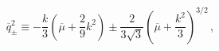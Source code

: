 \begin{equation}
\overline{q}_{\pm}^2\equiv -\frac{k}{3}\left(\overline{\mu}+
\frac{2}{9}k^2\right)\pm \frac{2}{3\sqrt{3}}\left(\overline{\mu}+
\frac{k^2}{3}\right)^{3/2}\,,
\end{equation}


